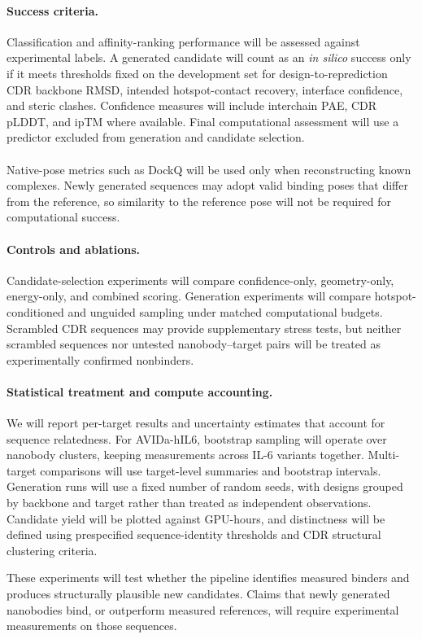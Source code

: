 \paragraph{Success criteria.}
Classification and affinity-ranking performance will be assessed against experimental labels. A generated candidate will count as an \emph{in silico} success only if it meets thresholds fixed on the development set for design-to-reprediction CDR backbone RMSD, intended hotspot-contact recovery, interface confidence, and steric clashes. Confidence measures will include interchain PAE, CDR pLDDT, and ipTM where available. Final computational assessment will use a predictor excluded from generation and candidate selection.\\\\
Native-pose metrics such as DockQ will be used only when reconstructing known complexes. Newly generated sequences may adopt valid binding poses that differ from the reference, so similarity to the reference pose will not be required for computational success.

\paragraph{Controls and ablations.}
Candidate-selection experiments will compare confidence-only, geometry-only, energy-only, and combined scoring. Generation experiments will compare hotspot-conditioned and unguided sampling under matched computational budgets. Scrambled CDR sequences may provide supplementary stress tests, but neither scrambled sequences nor untested nanobody--target pairs will be treated as experimentally confirmed nonbinders.

\paragraph{Statistical treatment and compute accounting.}
We will report per-target results and uncertainty estimates that account for sequence relatedness. For AVIDa-hIL6, bootstrap sampling will operate over nanobody clusters, keeping measurements across IL-6 variants together. Multi-target comparisons will use target-level summaries and bootstrap intervals. Generation runs will use a fixed number of random seeds, with designs grouped by backbone and target rather than treated as independent observations. Candidate yield will be plotted against GPU-hours, and distinctness will be defined using prespecified sequence-identity thresholds and CDR structural clustering criteria.

\noindent These experiments will test whether the pipeline identifies measured binders and produces structurally plausible new candidates. Claims that newly generated nanobodies bind, or outperform measured references, will require experimental measurements on those sequences.